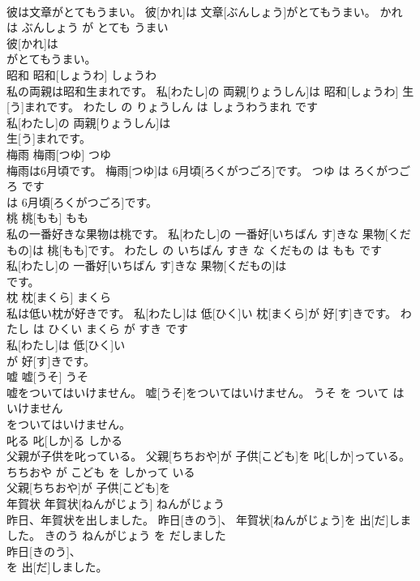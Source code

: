 \documentclass[8pt]{extreport}
\begin{document}
\begin{CJK}{UTF8}{min}
\\	彼は文章がとてもうまい。	彼[かれ]は 文章[ぶんしょう]がとてもうまい。	かれ は ぶんしょう が とても うまい	
\\	彼[かれ]は
\\	がとてもうまい。			
\\	昭和	昭和[しょうわ]	しょうわ	
\\	私の両親は昭和生まれです。	私[わたし]の 両親[りょうしん]は 昭和[しょうわ] 生[う]まれです。	わたし の りょうしん は しょうわうまれ です	
\\	私[わたし]の 両親[りょうしん]は
\\	生[う]まれです。			
\\	梅雨	梅雨[つゆ]	つゆ	
\\	梅雨は6月頃です。	梅雨[つゆ]は 6月頃[ろくがつごろ]です。	つゆ は ろくがつごろ です	
\\	は 6月頃[ろくがつごろ]です。			
\\	桃	桃[もも]	もも	
\\	私の一番好きな果物は桃です。	私[わたし]の 一番好[いちばん す]きな 果物[くだもの]は 桃[もも]です。	わたし の いちばん すき な くだもの は もも です	
\\	私[わたし]の 一番好[いちばん す]きな 果物[くだもの]は
\\	です。			
\\	枕	枕[まくら]	まくら	
\\	私は低い枕が好きです。	私[わたし]は 低[ひく]い 枕[まくら]が 好[す]きです。	わたし は ひくい まくら が すき です	
\\	私[わたし]は 低[ひく]い
\\	が 好[す]きです。			
\\	嘘	嘘[うそ]	うそ	
\\	嘘をついてはいけません。	嘘[うそ]をついてはいけません。	うそ を ついて は いけません	
\\	をついてはいけません。			
\\	叱る	叱[しか]る	しかる	
\\	父親が子供を叱っている。	父親[ちちおや]が 子供[こども]を 叱[しか]っている。	ちちおや が こども を しかって いる	
\\	父親[ちちおや]が 子供[こども]を
\\	年賀状	年賀状[ねんがじょう]	ねんがじょう	
\\	昨日、年賀状を出しました。	昨日[きのう]、 年賀状[ねんがじょう]を 出[だ]しました。	きのう ねんがじょう を だしました	
\\	昨日[きのう]、
\\	を 出[だ]しました。			

\end{CJK}
\end{document}

